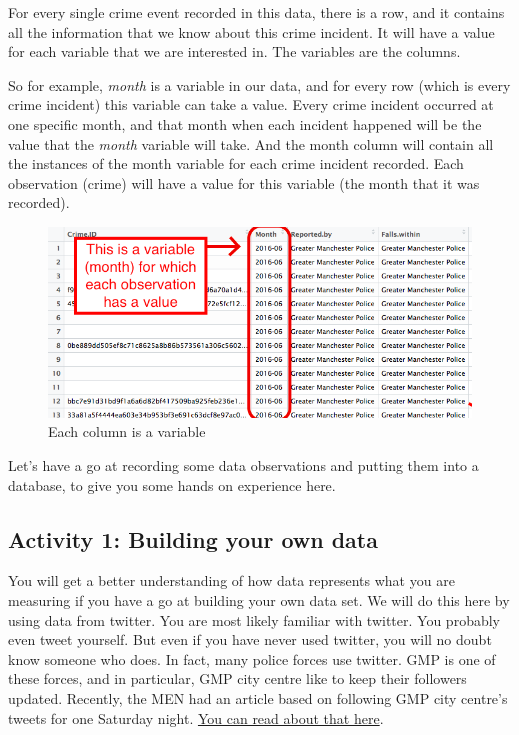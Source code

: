\documentclass[]{book}
\theoremstyle{definition}
\theoremstyle{definition}
\theoremstyle{definition}
\theoremstyle{remark}
\begin{document}
For every single crime event recorded in this data, there is a row, and
it contains all the information that we know about this crime incident.
It will have a value for each variable that we are interested in. The
variables are the columns.

So for example, \emph{month} is a variable in our data, and for every
row (which is every crime incident) this variable can take a value.
Every crime incident occurred at one specific month, and that month when
each incident happened will be the value that the \emph{month} variable
will take. And the month column will contain all the instances of the
month variable for each crime incident recorded. Each observation
(crime) will have a value for this variable (the month that it was
recorded).

\begin{figure}
\centering
\includegraphics{imgs/columnIsVariable.png}
\caption{Each column is a variable}
\end{figure}

Let's have a go at recording some data observations and putting them
into a database, to give you some hands on experience here.

\hypertarget{activity-1-building-your-own-data}{%
\subsection{Activity 1: Building your own
data}\label{activity-1-building-your-own-data}}

 You will get a better understanding of how data represents what you are
measuring if you have a go at building your own data set. We will do
this here by using data from twitter. You are most likely familiar with
twitter. You probably even tweet yourself. But even if you have never
used twitter, you will no doubt know someone who does. In fact, many
police forces use twitter. GMP is one of these forces, and in
particular, GMP city centre like to keep their followers updated.
Recently, the MEN had an article based on following GMP city centre's
tweets for one Saturday night.
\href{http://www.manchestereveningnews.co.uk/news/greater-manchester-news/what-police-city-centre-deal-13441129}{You
can read about that here}.
\end{document}
